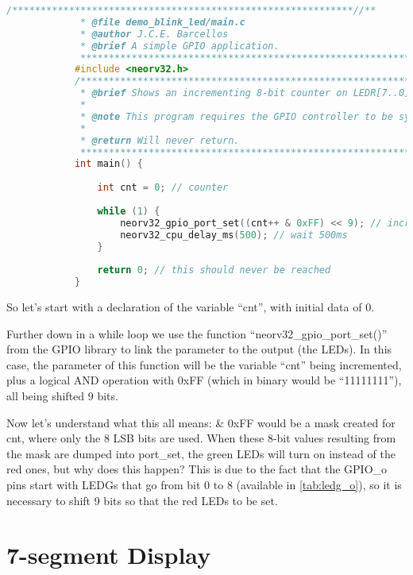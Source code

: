     
        \begin{lstlisting}[style=mystyle_c, language=c, breaklines]
            /************************************************************//**
             * @file demo_blink_led/main.c
             * @author J.C.E. Barcellos
             * @brief A simple GPIO application.
             ***************************************************************/
            #include <neorv32.h>
            /************************************************************//**
             * @brief Shows an incrementing 8-bit counter on LEDR[7..0].
             *
             * @note This program requires the GPIO controller to be synthesized.
             *
             * @return Will never return.
             ***************************************************************/
            int main() {
            
            	int cnt = 0; // counter
            	
            	while (1) {
            		neorv32_gpio_port_set((cnt++ & 0xFF) << 9); // increment counter and mask for lowest 8 bits
            		neorv32_cpu_delay_ms(500); // wait 500ms
            	}
            	
            	return 0; // this should never be reached
            }
    \end{lstlisting}

    So let's start with a declaration of the variable ``cnt'', with initial data of 0. 
    
    Further down in a while loop we use the function ``neorv32\_gpio\_port\_set()'' from the GPIO library to link the parameter to the output (the LEDs). In this case, the parameter of this function will be the variable ``cnt'' being incremented, plus a logical AND operation with 0xFF (which in binary would be ``11111111''), all being shifted 9 bits.
   
    Now let's understand what this all means: 
    \& 0xFF would be a mask created for cnt, where only the 8 LSB bits are used. When these 8-bit values resulting from the mask are dumped into port\_set, the green LEDs will turn on instead of the red ones, but why does this happen? This is due to the fact that the GPIO\_o pins start with LEDGs that go from bit 0 to 8 (available in \autoref{tab:ledg_o}), so it is necessary to shift 9 bits so that the red LEDs to be set.
    
    \section{7-segment Display} \label{sec:section_ex.2}

